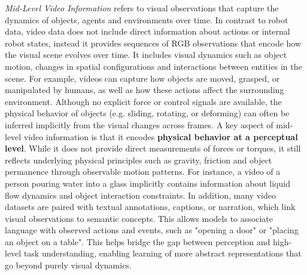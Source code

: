 \textit{Mid-Level Video Information}
refers to visual observations that capture the dynamics of objects, agents and environments over time. In contrast to robot data, video data does not include direct information about actions or internal robot states, instead it provides sequences of RGB observations that encode how the visual scene evolves over time.
It includes visual dynamics such as object motion, changes in spatial configurations and interactions between entities in the scene. For example, videos can capture how objects are moved, grasped, or manipulated by humans, as well as how these actions affect the surrounding environment. Although no explicit force or control signals are available, the physical behavior of objects (e.g. sliding, rotating, or deforming) can often be inferred implicitly from the visual changes across frames. 
A key aspect of mid-level video information is that it encodes \textbf{physical behavior at a perceptual level}. While it does not provide direct measurements of forces or torques, it still reflects underlying physical principles such as gravity, friction and object permanence through observable motion patterns. 
For instance, a video of a person pouring water into a glass implicitly contains information about liquid flow dynamics and object interaction constraints.
In addition, many video datasets are paired with textual annotations, captions, or narration, which link visual observations to semantic concepts. This allows models to associate language with observed actions and events, such as "opening a door" or "placing an object on a table". 
This helps bridge the gap between perception and high-level task understanding, enabling learning of more abstract representations that go beyond purely visual dynamics.




